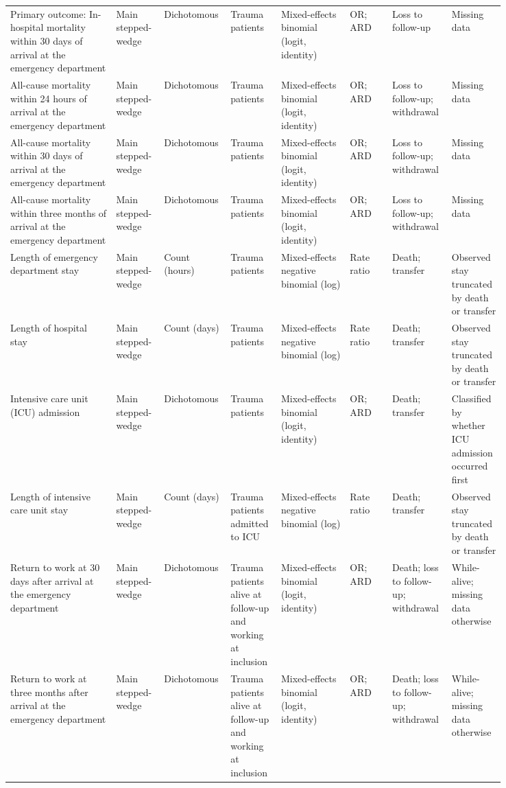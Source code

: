 \documentclass[
]{scrartcl}
\begin{document}
\begin{landscape}
\begin{longtable}{p{0.2\linewidth}p{0.08\linewidth}p{0.07\linewidth}p{0.09\linewidth}p{0.13\linewidth}p{0.08\linewidth}p{0.1\linewidth}p{0.09\linewidth}}
\endfoot
\bottomrule
\endlastfoot
Primary outcome: In-hospital mortality within 30 days of arrival at the emergency department & Main stepped-wedge & Dichotomous & Trauma patients & Mixed-effects binomial (logit, identity) & OR; ARD & Loss to follow-up & Missing data\\
All-cause mortality within 24 hours of arrival at the emergency department & Main stepped-wedge & Dichotomous & Trauma patients & Mixed-effects binomial (logit, identity) & OR; ARD & Loss to follow-up; withdrawal & Missing data\\
All-cause mortality within 30 days of arrival at the emergency department & Main stepped-wedge & Dichotomous & Trauma patients & Mixed-effects binomial (logit, identity) & OR; ARD & Loss to follow-up; withdrawal & Missing data\\
All-cause mortality within three months of arrival at the emergency department & Main stepped-wedge & Dichotomous & Trauma patients & Mixed-effects binomial (logit, identity) & OR; ARD & Loss to follow-up; withdrawal & Missing data\\
Length of emergency department stay & Main stepped-wedge & Count (hours) & Trauma patients & Mixed-effects negative binomial (log) & Rate ratio & Death; transfer & Observed stay truncated by death or transfer\\
\addlinespace
Length of hospital stay & Main stepped-wedge & Count (days) & Trauma patients & Mixed-effects negative binomial (log) & Rate ratio & Death; transfer & Observed stay truncated by death or transfer\\
Intensive care unit (ICU) admission & Main stepped-wedge & Dichotomous & Trauma patients & Mixed-effects binomial (logit, identity) & OR; ARD & Death; transfer & Classified by whether ICU admission occurred first\\
Length of intensive care unit stay & Main stepped-wedge & Count (days) & Trauma patients admitted to ICU & Mixed-effects negative binomial (log) & Rate ratio & Death; transfer & Observed stay truncated by death or transfer\\
Return to work at 30 days after arrival at the emergency department & Main stepped-wedge & Dichotomous & Trauma patients alive at follow-up and working at inclusion & Mixed-effects binomial (logit, identity) & OR; ARD & Death; loss to follow-up; withdrawal & While-alive; missing data otherwise\\
Return to work at three months after arrival at the emergency department & Main stepped-wedge & Dichotomous & Trauma patients alive at follow-up and working at inclusion & Mixed-effects binomial (logit, identity) & OR; ARD & Death; loss to follow-up; withdrawal & While-alive; missing data otherwise\\

\end{longtable}
\end{landscape}
\end{document}
